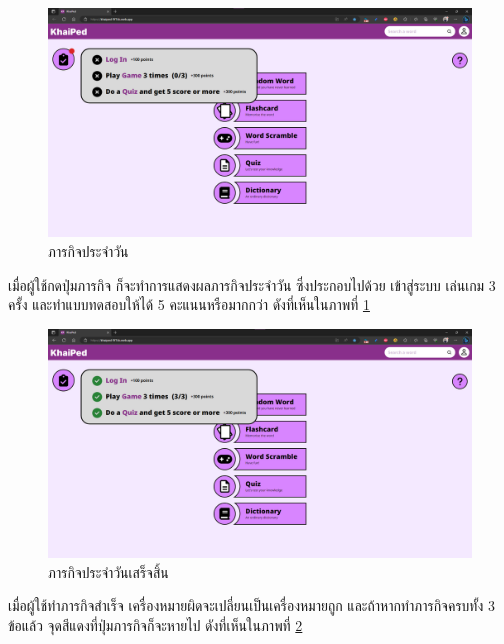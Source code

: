 \documentclass[12pt,oneside,openright,a4paper]{cpe-thai-project}
\begin{document}
\begin{figure}[!h]\centering
	\includegraphics[width=\textwidth, keepaspectratio=true]{image/chap4/Final/quest.png}
	\caption{{ภารกิจประจำวัน}}\label{fig:chap4FinQuest}
\end{figure}
\hspace{1cm}
เมื่อผู้ใช้กดปุ่มภารกิจ ก็จะทำการแสดงผลภารกิจประจำวัน ซึ่งประกอบไปด้วย
เข้าสู่ระบบ เล่นเกม 3 ครั้ง และทำแบบทดสอบให้ได้ 5 คะแนนหรือมากกว่า
ดังที่เห็นในภาพที่ \ref{fig:chap4FinQuest} 

\pagebreak
\begin{figure}[!h]\centering
	\includegraphics[width=\textwidth, keepaspectratio=true]{image/chap4/Final/quest done.png}
	\caption{{ภารกิจประจำวันเสร็จสิ้น}}\label{fig:chap4FinQuestDone}
\end{figure}
\hspace{1cm}
เมื่อผู้ใช้ทำภารกิจสำเร็จ เครื่องหมายผิดจะเปลี่ยนเป็นเครื่องหมายถูก และถ้าหากทำภารกิจครบทั้ง 3 ข้อแล้ว
จุดสีแดงที่ปุ่มภารกิจก็จะหายไป ดังที่เห็นในภาพที่ \ref{fig:chap4FinQuestDone}
\end{document}
